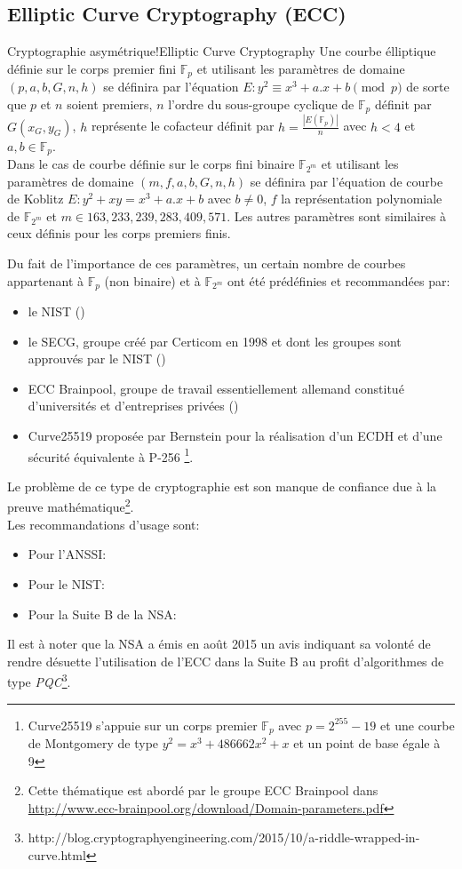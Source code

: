 \documentclass[twoside,a4paper,12pt,titlepage]{book}
\begin{document}
\subsection{Elliptic Curve Cryptography (ECC)\label{ECC}}
\begin{Define}{Cryptographie asymétrique!Elliptic Curve Cryptography}
Une courbe élliptique définie sur le corps premier fini $\mathbb{F}_p$ et utilisant les paramètres de domaine $(p,a,b,G,n,h)$ se définira par l'équation $E: y^2 \equiv x^3 + a.x + b \pmod p$ de sorte que $p$ et $n$ soient premiers, $n$ l'ordre du sous-groupe cyclique de $\mathbb{F}_p$ définit par $G(x_G,y_G)$, $h$ représente le cofacteur définit par $h=\frac{|E(\mathbb{F}_p)|}{n}$ avec $h<4$ et $a,b \in \mathbb{F}_p$.\\
Dans le cas de courbe définie sur le corps fini binaire $\mathbb{F}_{2^m}$ et utilisant les paramètres de domaine $(m,f,a,b,G,n,h)$ se définira par l'équation de courbe de Koblitz $E: y^2 + xy = x^3 + a.x + b$ avec $b \ne 0$, $f$ la représentation polynomiale de $\mathbb{F}_{2^m}$ et $m \in {163, 233, 239, 283, 409, 571}$. Les autres paramètres sont similaires à ceux définis pour les corps premiers finis. 
\end{Define}
Du fait de l'importance de ces paramètres, un certain nombre de courbes appartenant à $\mathbb{F}_p$ (non binaire) et à $\mathbb{F}_{2^m}$ ont été prédéfinies et recommandées par:\begin{itemize}
\item le \gls{NIST} (\ECCNIST)
\item le \gls{SECG}, groupe créé par Certicom en 1998 et dont les groupes sont approuvés par le \gls{NIST} (\ECCSECG)
\item ECC Brainpool, groupe de travail essentiellement allemand constitué d'universités et d'entreprises privées (\ECCBP)
\item Curve25519 proposée par Bernstein pour la réalisation d'un ECDH et d'une sécurité équivalente à P-256 \footnote{Curve25519 s'appuie sur un corps premier $\mathbb{F}_p$ avec $p=2^{255}-19$ et une courbe de Montgomery de type $y^2=x^3+486662x^2+x$ et un point de base égale à 9}.
\end{itemize}
Le problème de ce type de cryptographie est son manque de confiance due à la preuve mathématique\footnote{Cette thématique est abordé par le groupe ECC Brainpool dans \url{http://www.ecc-brainpool.org/download/Domain-parameters.pdf}}.\\
Les recommandations d'usage sont:\begin{itemize}
\item Pour l'\gls{ANSSI}: \ECDHrecosizeAnssi
\item Pour le \gls{NIST}: \ECDHrecosizeNIST
\item Pour la Suite B de la \gls{NSA}: \ECDHrecosizeCNSA
\end{itemize}
Il est à noter que la \gls{NSA} a émis en août 2015 un avis indiquant sa volonté de rendre désuette l'utilisation de l'\gls{ECC} dans la Suite B au profit d'algorithmes de type \textit{\gls{PQC}}\footnote{http://blog.cryptographyengineering.com/2015/10/a-riddle-wrapped-in-curve.html}.
\end{document}
